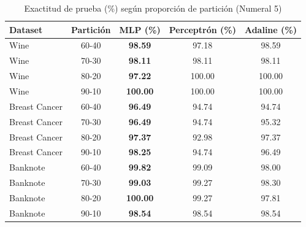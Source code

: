 \begin{table}[htbp]
    \centering
    \small
    \caption{Exactitud de prueba (\%) según proporción de partición (Numeral 5)}
    \label{tab:particiones_exactitud}
    \begin{tabular}{lcccc}
        \toprule
        \textbf{Dataset} & \textbf{Partición} & \textbf{MLP (\%)} & \textbf{Perceptrón (\%)} & \textbf{Adaline (\%)} \\
        \midrule
        Wine          & 60-40 & \textbf{98.59} & 97.18 & 98.59 \\
        Wine          & 70-30 & \textbf{98.11} & 98.11 & 98.11 \\
        Wine          & 80-20 & \textbf{97.22} & 100.00 & 100.00 \\
        Wine          & 90-10 & \textbf{100.00} & 100.00 & 100.00 \\
        \midrule
        Breast Cancer & 60-40 & \textbf{96.49} & 94.74 & 94.74 \\
        Breast Cancer & 70-30 & \textbf{96.49} & 94.74 & 95.32 \\
        Breast Cancer & 80-20 & \textbf{97.37} & 92.98 & 97.37 \\
        Breast Cancer & 90-10 & \textbf{98.25} & 94.74 & 96.49 \\
        \midrule
        Banknote      & 60-40 & \textbf{99.82} & 99.09 & 98.00 \\
        Banknote      & 70-30 & \textbf{99.03} & 99.27 & 98.30 \\
        Banknote      & 80-20 & \textbf{100.00} & 99.27 & 97.81 \\
        Banknote      & 90-10 & \textbf{98.54} & 98.54 & 98.54 \\
        \bottomrule
    \end{tabular}
\end{table}
